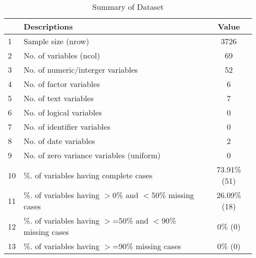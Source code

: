 \begin{table}[ht]
\centering
\caption{Summary of Dataset} 
\begin{tabular}{llc}
  \hline
 & Descriptions & Value \\ 
  \hline
1 & Sample size (nrow) & 3726 \\ 
  2 & No. of variables (ncol) & 69 \\ 
  3 & No. of numeric/interger variables & 52 \\ 
  4 & No. of factor variables & 6 \\ 
  5 & No. of text variables & 7 \\ 
  6 & No. of logical variables & 0 \\ 
  7 & No. of identifier variables & 0 \\ 
  8 & No. of date variables & 2 \\ 
  9 & No. of zero variance variables (uniform) & 0 \\ 
  10 & \%. of variables having complete cases & 73.91\% (51) \\ 
  11 & \%. of variables having $>$0\% and $<$50\% missing cases & 26.09\% (18) \\ 
  12 & \%. of variables having $>$=50\% and $<$90\% missing cases & 0\% (0) \\ 
  13 & \%. of variables having $>$=90\% missing cases & 0\% (0) \\ 
   \hline
\end{tabular}
\end{table}
